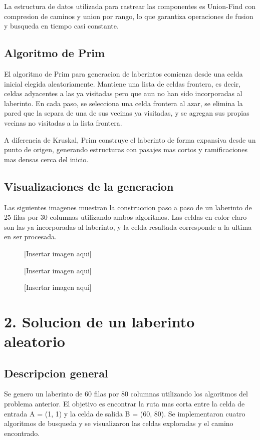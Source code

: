 \documentclass[12pt]{article}
\newcommand{\imgplaceholder}[2]{%
  \begin{figure}[H]
    \centering
    \fbox{\rule{0pt}{#2}\rule{#1}{0pt}}
    \caption{[Insertar imagen aqui]}
  \end{figure}%
}
\begin{document}
La estructura de datos utilizada para rastrear las componentes es Union-Find con compresion de caminos y union por rango, lo que garantiza operaciones de fusion y busqueda en tiempo casi constante.

\subsection{Algoritmo de Prim}

El algoritmo de Prim para generacion de laberintos comienza desde una celda inicial elegida aleatoriamente. Mantiene una lista de celdas frontera, es decir, celdas adyacentes a las ya visitadas pero que aun no han sido incorporadas al laberinto. En cada paso, se selecciona una celda frontera al azar, se elimina la pared que la separa de una de sus vecinas ya visitadas, y se agregan sus propias vecinas no visitadas a la lista frontera.

A diferencia de Kruskal, Prim construye el laberinto de forma expansiva desde un punto de origen, generando estructuras con pasajes mas cortos y ramificaciones mas densas cerca del inicio.

\subsection{Visualizaciones de la generacion}

Las siguientes imagenes muestran la construccion paso a paso de un laberinto de 25 filas por 30 columnas utilizando ambos algoritmos. Las celdas en color claro son las ya incorporadas al laberinto, y la celda resaltada corresponde a la ultima en ser procesada.

\imgplaceholder{0.45\textwidth}{5cm}
\imgplaceholder{0.45\textwidth}{5cm}

\imgplaceholder{0.9\textwidth}{5cm}

\section{2. Solucion de un laberinto aleatorio}

\subsection{Descripcion general}

Se genero un laberinto de 60 filas por 80 columnas utilizando los algoritmos del problema anterior. El objetivo es encontrar la ruta mas corta entre la celda de entrada A = (1, 1) y la celda de salida B = (60, 80). Se implementaron cuatro algoritmos de busqueda y se visualizaron las celdas exploradas y el camino encontrado.
\end{document}
